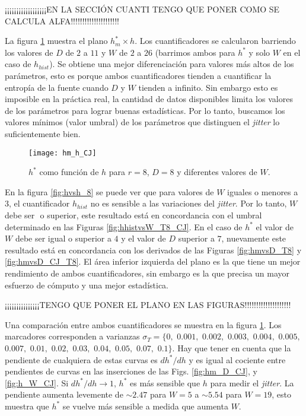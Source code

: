 ¡¡¡¡¡¡¡¡¡¡¡¡¡¡¡¡¡¡EN LA SECCIÓN CUANTI TENGO QUE PONER COMO SE CALCULA ALFA!!!!!!!!!!!!!!!!!!!!!

La figura \ref{fig:hm_h_CJ} muestra el plano $h^*_{m} \times h$.
Los cuantificadores se calcularon barriendo los valores de $D$ de $2$ a $11$ y $W$ de $2$ a $26$ (barrimos ambos para $h^*$ y solo $W$ en el caso de $h_{hist}$).
Se obtiene una mejor diferenciación para valores más altos de los parámetros, esto es porque ambos cuantificadores tienden a cuantificar la entropía de la fuente cuando $D$ y $W$ tienden a infinito.
Sin embargo esto es imposible en la práctica real, la cantidad de datos disponibles limita los valores de los parámetros para lograr buenas estadísticas.
Por lo tanto, buscamos los valores mínimos (valor umbral) de los parámetros que distinguen el \textit{jitter} lo suficientemente bien.
%
\begin{figure}
	\centering
	\texttt{[image: hm\_h\_CJ]}
	\caption{$h^*$ como función de $h$ para $r=8$, $D=8$ y diferentes valores de $W$.}
	\label{fig:hm_h_CJ}
\end{figure}

En la figura \ref{fig:hvsh_8} se puede ver que para valores de $W$ iguales o menores a $3$, el cuantificador $h_{hist}$ no es sensible a las variaciones del \textit{jitter}.
Por lo tanto, $W$ debe ser $ $ o superior, este resultado está en concordancia con el umbral determinado en las Figuras \ref{fig:hhistvsW_T8_CJ}.
En el caso de $h^*$ el valor de $W$ debe ser igual o superior a $4$ y el valor de $D$ superior a $7$, nuevamente este resultado está en concordancia con los derivados de las Figuras \ref{fig:hmvsD_T8} y \ref{fig:hmvsD_CJ_T8}.
El área inferior izquierda del plano es la que tiene un mejor rendimiento de ambos cuantificadores, sin embargo es la que precisa un mayor esfuerzo de cómputo y una mejor estadística.

¡¡¡¡¡¡¡¡¡¡¡¡¡¡¡TENGO QUE PONER EL PLANO EN LAS FIGURAS!!!!!!!!!!!!!!!!!!!!

Una comparación entre ambos cuantificadores se muestra en la figura \ref{fig:hm_h_CJ}.
Los marcadores corresponden a varianzas $\sigma_T=\{0,$ $0.001,$ $0.002,$ $0.003,$ $0.004,$ $0.005,$ $0.007,$ $0.01,$ $0.02,$ $0.03,$ $0.04,$ $0.05,$ $0.07,$ $0.1\}$.
Hay que tener en cuenta que la pendiente de cualquiera de estas curvas es $dh^*/dh$ y es igual al cociente entre pendientes de curvas en las inserciones de las Figs. \ref{fig:hm_D_CJ}, y \ref{fig:h_W_CJ}.
Si $dh^*/dh\to1$, $h^*$ es más sensible que $h$ para medir el \textit{jitter}.
La pendiente aumenta levemente de $\sim2.47$ para $W =5 $ a $\sim5.54$ para $W = 19$, esto muestra que $h^*$ se vuelve más sensible a medida que aumenta $W$.


